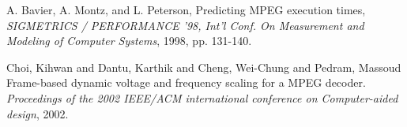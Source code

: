 \begin{thebibliography}{}


A. Bavier, A. Montz, and L. Peterson,
Predicting MPEG execution times,
\emph{SIGMETRICS / PERFORMANCE ’98, Int’l Conf. On Measurement and Modeling of Computer Systems}, 
1998, pp. 131-140.

Choi, Kihwan and Dantu, Karthik and Cheng, Wei-Chung and Pedram, Massoud
Frame-based dynamic voltage and frequency scaling for a MPEG decoder.
\emph{Proceedings of the 2002 IEEE/ACM international conference on Computer-aided design},
2002.



\end{thebibliography}
